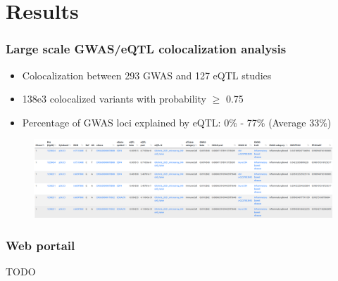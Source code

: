 \documentclass{beamer}
\begin{document}
    \section{Results}

    \begin{frame}
        \frametitle{Large scale GWAS/eQTL colocalization analysis}


        \begin{itemize}
            \item Colocalization between 293 GWAS and 127 eQTL studies
            \item 138e3 colocalized variants with probability $\geq$ 0.75
            \item Percentage of GWAS loci explained by eQTL: 0$\%$ - 77$\%$ (Average 33$\%$)
        \end{itemize}

        \begin{figure}[!]
            \includegraphics[width=\textwidth]{../presentation_230120_gold2022_paris/fig/coloc_web.png}
        \end{figure}

    \end{frame}

    \begin{frame}
        \frametitle{Web portail}


        TODO

    \end{frame}
\end{document}
